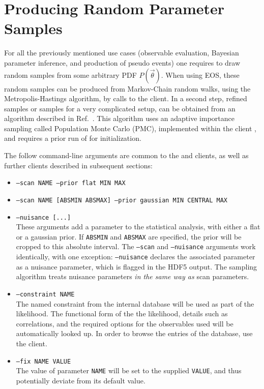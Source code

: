 \section{Producing Random Parameter Samples}
\label{sec:usage:eos-sample-mcmc+pmc}

For all the previously mentioned use cases (observable evaluation, Bayesian
parameter inference, and production of pseudo events) one requires to draw
random samples from some arbitrary \gls{PDF} $P(\vec\theta)$.  When using EOS,
these random samples can be produced from Markov-Chain random walks, using the
Metropolis-Hastings algorithm, by calls to the  client.
In a second step, refined samples or samples for a very complicated setup, can
be obtained from an algorithm described in Ref.~\cite{Beaujean:2013}. This
algorithm uses an adaptive importance sampling called Population Monte Carlo
(PMC), implemented within the client , and requires a
prior run of  for initialization.


The follow command-line arguments are common to the  and 
 clients, as well as further clients described in subsequent
sections:
\begin{itemize}
    \item[] \texttt{--scan NAME --prior flat MIN MAX}\\[-3\medskipamount]
    \item[] \texttt{--scan NAME [ABSMIN ABSMAX] --prior gaussian MIN CENTRAL MAX}\\[-3\medskipamount]
    \item[] \texttt{--nuisance [...]}\\[\medskipamount]
        These arguments add a parameter to the statistical analysis, with
        either a flat or a gaussian prior. If \texttt{ABSMIN} and
        \texttt{ABSMAX} are specified, the prior will be cropped to this
        absolute interval.  The \texttt{--scan} and \texttt{--nuisance}
        arguments work identically, with one exception: \texttt{--nuisance}
        declares the associated parameter as a nuisance parameter, which is
        flagged in the HDF5 output. The sampling algorithm treats nuisance
        parameters \emph{in the same way as} scan parameters.

    \item[] \texttt{--constraint NAME}\\[\medskipamount]
        The named constraint from the internal database will be used as part of
        the likelihood. The functional form of the the likelihood, details such
        as correlations, and the required options for the observables used will
        be automatically looked up. In order to browse the entries of the
        database, use the  client.

    \item[] \texttt{--fix NAME VALUE}\\[\medskipamount]
        The value of parameter \texttt{NAME} will be set to the supplied
        \texttt{VALUE}, and thus potentially deviate from its default value.
\end{itemize}

